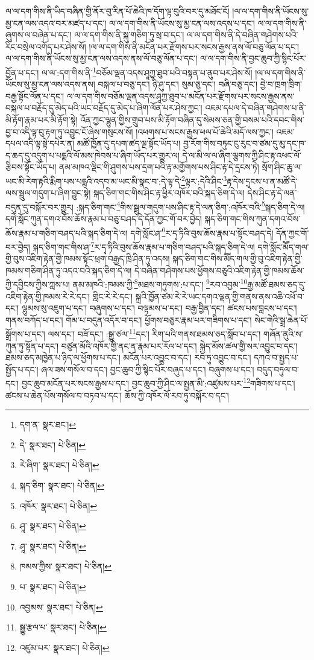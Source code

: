 ལ་ལ་དག་གིས་ནི་ཡིད་བཞིན་གྱི་ནོར་བུ་རིན་པོ་ཆེའི་ཁ་དོག་ལྟ་བུའི་བར་དུ་མཐོང་ངོ། །ལ་ལ་དག་གིས་ནི་ཡོངས་སུ་མྱ་ངན་ལས་འདའ་བར་མཛད་པ་དང་། ལ་ལ་དག་གིས་ནི་ཡོངས་སུ་མྱ་ངན་ལས་འདས་པ་དང་། ལ་ལ་དག་གིས་ནི་ཞུགས་ལ་བཞེན་པ་དང་། ལ་ལ་དག་གིས་ནི་སྐུ་གཅིག་ཏུ་སྲ་བ་དང་། ལ་ལ་དག་གིས་ནི་དེ་བཞིན་གཤེགས་པའི་རིང་བསྲེལ་འགོད་པར་ཤེས་སོ། །ལ་ལ་དག་གིས་ནི་མངོན་པར་རྫོགས་པར་སངས་རྒྱས་ནས་ལོ་བཅུ་ལོན་པ་དང་། ལ་ལ་དག་གིས་ནི་ཡོངས་སུ་མྱ་ངན་ལས་འདས་ནས་ལོ་བཅུ་ལོན་པ་དང་། ལ་ལ་དག་གིས་ནི་བྱང་ཆུབ་ཀྱི་སྙིང་པོར་བྱོན་པ་དང་། ལ་ལ་:དག་གིས་ནི་\footnote{དག་ན་  སྣར་ཐང་། }བཅོམ་ལྡན་འདས་ཤཱཀྱ་ཐུབ་པའི་བསྟན་པ་ནུབ་པར་ཤེས་སོ། །ལ་ལ་དག་གིས་ནི་ཡོངས་སུ་མྱ་ངན་ལས་འདས་ནས། བསྐལ་པ་བཅུ་དང་། ཉི་ཤུ་དང་། སུམ་ཅུ་དང་། བཞི་བཅུ་དང་། བྱེ་བ་ཁྲག་ཁྲིག་བརྒྱ་སྟོང་ལོན་པ་དང་། ལ་ལ་དག་གིས་བཅོམ་ལྡན་འདས་ཤཱཀྱ་ཐུབ་པ་མངོན་པར་རྫོགས་པར་སངས་རྒྱས་ནས་བསྐལ་པ་བརྗོད་དུ་མེད་པའི་ཡང་བརྗོད་དུ་མེད་པ་ཞིག་ལོན་པར་ཤེས་ཀྱང་། འཇམ་དཔལ་དེ་བཞིན་གཤེགས་པ་ནི་མི་རྟོག་རྣམ་པར་མི་རྟོག་སྟེ། འོན་ཀྱང་ལྷུན་གྱིས་གྲུབ་པས་མི་རྟོག་བཞིན་དུ་སེམས་ཅན་གྱི་བསམ་པའི་དབང་གིས་བྱ་བ་འདི་ལྟ་བུ་རྟག་ཏུ་འབྱུང་ངོ་ཞེས་གསུངས་སོ། །འཕགས་པ་སངས་རྒྱས་ཕལ་པོ་ཆེའི་མདོ་ལས་ཀྱང་། འཇམ་དཔལ་འདི་ལྟ་སྟེ་དཔེར་ན། མཚོ་ཁྱོན་དུ་དཔག་ཚད་ལྔ་སྟོང་ཡོད་པ། བྱ་རོག་གིས་བཏུང་ངུ་རུང་བ་ཙམ་དུ་མུ་དང་ཁ་ད་ཆད་དུ་འདུག་པ་པདྨའི་ལོ་མས་ཁེབས་པ་ཞིག་ཡོད་པར་གྱུར་ལ། དེ་ལ་མི་ལ་ལ་ཞིག་ལྕགས་ཀྱི་ཤིང་རྟ་འཕང་ལོ་རྩིབས་སྟོང་ཡོད་པ། ནམ་མཁའ་ལྡིང་གི་ཤུགས་པས་དྲག་པའི་རྟ་མགྱོགས་པས་ཤིང་རྟ་དེ་དྲངས་ཏེ། སྲོག་ཤིང་ཆུ་ལ་ཡང་མི་རེག་རྟའི་རྨིག་པས་པདྨའི་འདབ་མ་ཡང་མི་སྣང་བ་:དེ་ལྟ་དེ་\footnote{དེ་  སྣར་ཐང་།  པེ་ཅིན། }ལྟར་:དེའི་ཤིང་\footnote{རེ་ཞིག་  སྣར་ཐང་།  པེ་ཅིན། }རྟ་དེས་དྲངས་པ་ན་མཚོ་དེ་ལས་སྦྲུལ་གདུག་པ་ཞིག་བྱུང་སྟེ། སྐད་ཅིག་གང་གིས་ཤིང་རྟ་ཕྱིར་འཁོར་བའི་སྐད་ཅིག་དེ་ལ། དེས་ཤིང་རྟ་དེ་ལན་བདུན་དུ་བསྐོར་བར་གྱུར། :སྐད་ཅིག་གང་\footnote{སྐད་ཅིག་  སྣར་ཐང་།  པེ་ཅིན། }གིས་སྦྲུལ་གདུག་པས་ཤིང་རྟ་དེ་ལན་ཅིག་:འཁོར་བའི་\footnote{འཁོར་  སྣར་ཐང་།  པེ་ཅིན། }སྐད་ཅིག་དེ་ལ། དགེ་སློང་ཀུན་དགའ་བོས་ཆོས་རྣམ་པ་བཅུ་བཤད་དེ་དོན་ཀྱང་གོ་བར་བྱེད། སྐད་ཅིག་གང་གིས་ཀུན་དགའ་བོས་ཆོས་རྣམ་པ་གཅིག་བཤད་པའི་སྐད་ཅིག་དེ་ལ། དགེ་སློང་ཤ་\footnote{ཤཱ་  སྣར་ཐང་།  པེ་ཅིན། }ར་དྭ་ཏིའི་བུས་ཆོས་རྣམ་པ་སྟོང་བཤད་དེ། དོན་ཀྱང་གོ་བར་བྱེད། སྐད་ཅིག་གང་གིས་ཤ་\footnote{ཤཱ་  སྣར་ཐང་།  པེ་ཅིན། }ར་དྭ་ཏིའི་བུས་ཆོས་རྣམ་པ་གཅིག་བཤད་པའི་སྐད་ཅིག་དེ་ལ། དགེ་སློང་མཽད་གལ་གྱི་བུས་འཇིག་རྟེན་གྱི་ཁམས་སྟོང་ཕྲག་བརྒྱད་ཁྲི་ཤིན་ཏུ་འདས། སྐད་ཅིག་གང་གིས་མཽད་གལ་གྱི་བུ་འཇིག་རྟེན་གྱི་ཁམས་གཅིག་ཤིན་ཏུ་འདའ་བའི་སྐད་ཅིག་དེ་ལ། དེ་བཞིན་གཤེགས་པས་ཕྱོགས་བཅུའི་འཇིག་རྟེན་གྱི་ཁམས་ཆོས་ཀྱི་དབྱིངས་ཀྱིས་ཀླས་པ། ནམ་མཁའི་:ཁམས་ཀྱི་\footnote{ཁམས་ཀྱིས་  སྣར་ཐང་།  པེ་ཅིན། }མཐས་གཏུགས་:པ་དང་། \footnote{པ་  སྣར་ཐང་།  པེ་ཅིན། }རབ་འབྱམ་\footnote{འབྱམས་  སྣར་ཐང་།  པེ་ཅིན། }རྒྱ་མཚོ་ཐམས་ཅད་དུ་འཇིག་རྟེན་གྱི་ཁམས་རེ་རེ་དང་། གླིང་རེ་རེ་དང་། སྐྲའི་ཁྱོན་ཙམ་རེ་རེ་ཡང་དགའ་ལྡན་གྱི་གནས་ནས་འཆི་འཕོ་བ་དང་། ལྷུམས་སུ་འཇུག་པ་དང་། བཞུགས་པ་དང་། བལྟམས་པ་དང་། བརྒྱ་བྱིན་དང་། ཚངས་པས་བླངས་པ་དང་། གནས་བཀོད་པ་དང་། གོམ་པ་བདུན་འདོར་བ་དང་། ཕྱོགས་བཅུར་རྣམ་པར་གཟིགས་པ་དང་། སེང་གེའི་སྒྲ་ཆེན་པོ་སྒྲོགས་པ་དང་། ལས་དང་། བཟོ་དང་། :སྒྱུ་ཙལ་\footnote{སྒྱུ་རྩལ་པ་  སྣར་ཐང་།  པེ་ཅིན། }དང་། རིག་པའི་གནས་ཐམས་ཅད་སློབ་པ་དང་། གཞོན་ནུའི་ས་ཀུན་ཏུ་སྟོན་པ་དང་། བཙུན་མོའི་འཁོར་གྱི་ནང་ན་རྣམ་པར་རོལ་པ་དང་། སྐྱེད་མོས་ཚལ་གྱི་སར་འབྱུང་བ་དང་། ཐམས་ཅད་མཁྱེན་པ་ཉིད་ལ་ཕྱོགས་པ་དང་། མངོན་པར་འབྱུང་བ་དང་། རབ་ཏུ་འབྱུང་བ་དང་། དཀའ་བ་སྤྱད་པ་སྤྱོད་པ་དང་། ཞལ་ཟས་གསོལ་བ་དང་། བྱང་ཆུབ་ཀྱི་སྙིང་པོར་བཞུད་པ་དང་། བཞུགས་པ་དང་། བདུད་བཏུལ་བ་དང་། བྱང་ཆུབ་མངོན་པར་སངས་རྒྱས་པ་དང་། བྱང་ཆུབ་ཀྱི་ཤིང་ལ་སྤྱན་མི་:འཛུམས་པར་\footnote{འཛུམ་པར་  སྣར་ཐང་།  པེ་ཅིན། }གཟིགས་པ་དང་། ཚངས་པ་ཆེན་པོས་གསོལ་བ་བཏབ་པ་དང་། ཆོས་ཀྱི་འཁོར་ལོ་རབ་ཏུ་བསྐོར་བ་དང་། 